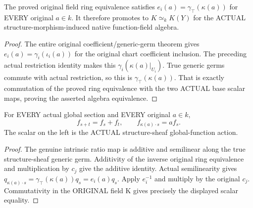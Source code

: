 \begin{theorem}
\label{thm:seven-native-actual-function-field-algebra}
\leanok
The proved original field ring equivalence satisfies
$e_i(a)=\gamma_\top(\kappa(a))$ for EVERY original $a\in k$.
It therefore promotes to $K\simeq_k K(Y)$ for the ACTUAL
structure-morphism-induced native function-field algebra.
\end{theorem}
\begin{proof}
The entire original coefficient/generic-germ theorem gives
$e_i(a)=\gamma_i(\iota_i(a))$ for the original chart coefficient inclusion.
The preceding actual restriction identity makes this
$\gamma_i(\kappa(a)|_{U_i})$. True generic germs commute with actual
restriction, so this is $\gamma_\top(\kappa(a))$.
That is exactly commutation of the proved ring equivalence with the two
ACTUAL base scalar maps, proving the asserted algebra equivalence.
\end{proof}

\begin{theorem}
\label{thm:seven-native-actual-H0-scalar-laws}
\leanok
For EVERY actual global section and EVERY original $a\in k$,
\[
 f_{s+t}=f_s+f_t,\qquad f_{\kappa(a)\cdot s}=a f_s.
\]
The scalar on the left is the ACTUAL structure-sheaf global-function action.
\end{theorem}
\begin{proof}
The genuine intrinsic ratio map is additive and semilinear along the true
structure-sheaf generic germ. Additivity of the inverse original ring
equivalence and multiplication by $c_j$ give the additive identity.
Actual semilinearity gives
$q_{\kappa(a)\cdot s}=\gamma_\top(\kappa(a))q_s=e_i(a)q_s$.
Apply $e_i^{-1}$ and multiply by the original $c_j$. Commutativity in the
ORIGINAL field K gives precisely the displayed scalar equality.
\end{proof}

